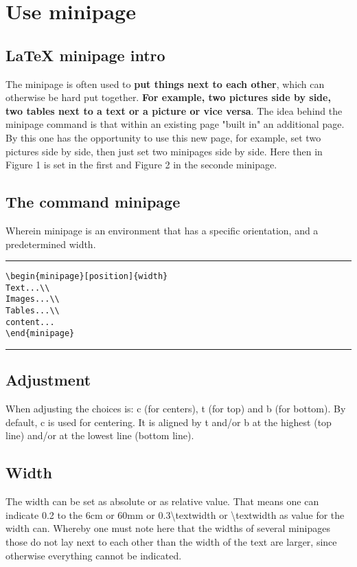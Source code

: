 

\section{Use minipage}
\subsection{\LaTeX{} minipage intro}
The minipage is often used to \textbf{put things next to each other}, which can otherwise be hard put together. \textbf{For example, two pictures side by side, two tables next to a text or a picture or vice versa}. The idea behind the minipage command is that within an existing page "built in" an additional page. By this one has the opportunity to use this new page, for example, set two pictures side by side, then just set two minipages side by side. Here then in Figure 1 is set in the first and Figure 2 in the seconde minipage.

\subsection{The command minipage}
Wherein minipage is an environment that has a specific orientation, and a predetermined width.

\noindent\vspace{1em}\hrule
\begin{verbatim}
\begin{minipage}[position]{width}
Text...\\
Images...\\
Tables...\\
content...
\end{minipage}
\end{verbatim}
\noindent\hrule

\subsection{Adjustment}
When adjusting the choices is: c (for centers), t (for top) and b (for bottom). By default, c is used for centering. It is aligned by t and/or b at the highest (top line) and/or at the lowest line (bottom line).

\subsection{Width}
The width can be set as absolute or as relative value. That means one can indicate 0.2 to the 6cm or 60mm or 0.3\textbackslash textwidth or \textbackslash textwidth as value for the width can. Whereby one must note here that the widths of several minipages those do not lay next to each other than the width of the text are larger, since otherwise everything cannot be indicated.

